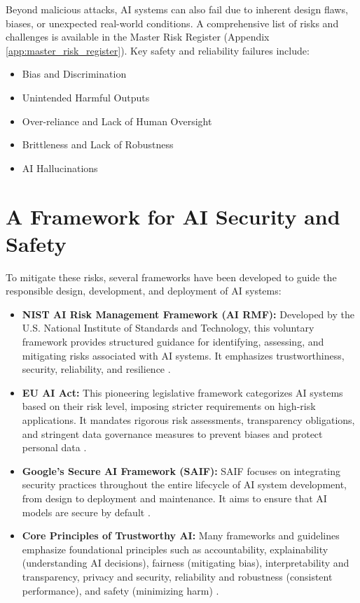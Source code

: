 Beyond malicious attacks, AI systems can also fail due to inherent design flaws, biases, or unexpected real-world conditions. A comprehensive list of risks and challenges is available in the Master Risk Register (Appendix \ref{app:master_risk_register}). Key safety and reliability failures include:

\begin{itemize}
    \item Bias and Discrimination
    \item Unintended Harmful Outputs
    \item Over-reliance and Lack of Human Oversight
    \item Brittleness and Lack of Robustness
    \item AI Hallucinations
\end{itemize}

\section{A Framework for AI Security and Safety}
\label{sec:security_framework}
To mitigate these risks, several frameworks have been developed to guide the responsible design, development, and deployment of AI systems:

\begin{itemize}
    \item \textbf{NIST AI Risk Management Framework (AI RMF):} Developed by the U.S. National Institute of Standards and Technology, this voluntary framework provides structured guidance for identifying, assessing, and mitigating risks associated with AI systems. It emphasizes trustworthiness, security, reliability, and resilience \parencite{NIST2023AIRMF}.
    \item \textbf{EU AI Act:} This pioneering legislative framework categorizes AI systems based on their risk level, imposing stricter requirements on high-risk applications. It mandates rigorous risk assessments, transparency obligations, and stringent data governance measures to prevent biases and protect personal data \parencite{EU_AI_Act_2024}.
    \item \textbf{Google's Secure AI Framework (SAIF):} SAIF focuses on integrating security practices throughout the entire lifecycle of AI system development, from design to deployment and maintenance. It aims to ensure that AI models are secure by default \parencite{SafetyGoogle2023}.
    \item \textbf{Core Principles of Trustworthy AI:} Many frameworks and guidelines emphasize foundational principles such as accountability, explainability (understanding AI decisions), fairness (mitigating bias), interpretability and transparency, privacy and security, reliability and robustness (consistent performance), and safety (minimizing harm) \parencite{MaximAI2025}.
\end{itemize}

